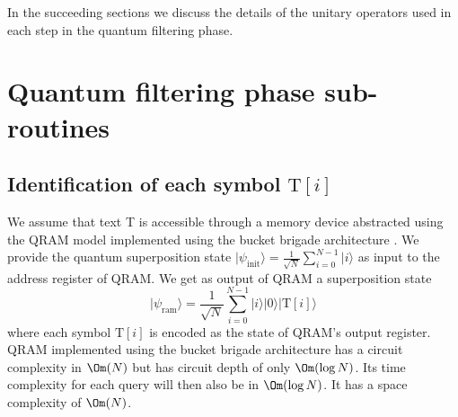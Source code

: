 In the succeeding sections we discuss the details of the unitary operators used in each step in the quantum filtering phase.

\section{Quantum filtering phase sub-routines}
\subsection{Identification of each symbol $\mathrm{T}[i]$}
We assume that text T is accessible through a memory device abstracted using the QRAM model implemented using the bucket brigade architecture \cite{Giovannetti2008b}. We provide the quantum superposition state $\vert \psi_{\mathrm{init}} \rangle = \frac{1}{\sqrt{N}} \sum_{i=0}^{N-1} \vert i \rangle$ as input to the address register of QRAM. We get as output of QRAM a superposition state
\[
	\vert \psi_{\mathrm{ram}} \rangle = \frac{1}{\sqrt{N}} \sum_{i=0}^{N-1} \vert i \rangle\vert 0 \rangle\vert \mathrm{T}[i] \rangle
\]
where each symbol $\mathrm{T}[i]$ is encoded as the state of QRAM's output register. 
QRAM implemented using the bucket brigade architecture has a circuit complexity in $\Om(N)$ but has circuit depth of only $\Om(\log N)$. Its time complexity for each query will then also be in $\Om(\log N)$. It has a space complexity of $\Om(N)$. 

